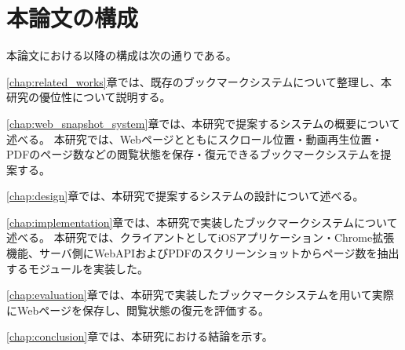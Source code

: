 \section{本論文の構成}

本論文における以降の構成は次の通りである。

\ref{chap:related_works}章では、既存のブックマークシステムについて整理し、本研究の優位性について説明する。

\ref{chap:web_snapshot_system}章では、本研究で提案するシステムの概要について述べる。
本研究では、Webページとともにスクロール位置・動画再生位置・PDFのページ数などの閲覧状態を保存・復元できるブックマークシステムを提案する。

\ref{chap:design}章では、本研究で提案するシステムの設計について述べる。

\ref{chap:implementation}章では、本研究で実装したブックマークシステムについて述べる。
本研究では、クライアントとしてiOSアプリケーション・Chrome拡張機能、サーバ側にWebAPIおよびPDFのスクリーンショットからページ数を抽出するモジュールを実装した。

\ref{chap:evaluation}章では、本研究で実装したブックマークシステムを用いて実際にWebページを保存し、閲覧状態の復元を評価する。

\ref{chap:conclusion}章では、本研究における結論を示す。